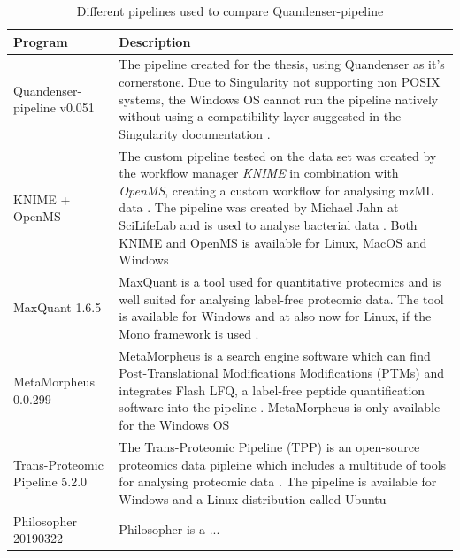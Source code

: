 \newcommand{\textone}{\small The pipeline created for the thesis, using Quandenser as it's cornerstone. Due to Singularity not supporting non POSIX systems, the Windows OS cannot run the pipeline natively without using a compatibility layer suggested in the Singularity documentation \cite{singularity-documentation}. }
\newcommand{\texttwo}{\small The custom pipeline tested on the data set was created by the workflow manager \textit{KNIME} in combination with \textit{OpenMS}, creating a custom workflow for analysing mzML data \cite{knime} \cite{openms}. The pipeline was created by Michael Jahn at SciLifeLab and is used to analyse bacterial data \cite{m-jahn-pipeline}. Both KNIME and OpenMS is available for Linux, MacOS and Windows}
\newcommand{\textthree}{\small MaxQuant is a tool used for quantitative proteomics and is well suited for analysing label-free proteomic data. The tool is available for Windows and at also now for Linux, if the Mono framework is used \cite{maxquant} \cite{maxquant-installation}.}
\newcommand{\textfour}{\small MetaMorpheus is a search engine software which can find Post-Translational Modifications Modifications (PTMs) and integrates Flash LFQ, a label-free peptide quantification software into the pipeline \cite{metamorpheus}. MetaMorpheus is only available for the Windows OS}
\newcommand{\textfive}{\small The Trans-Proteomic Pipeline (TPP) is an open-source proteomics data pipleine which includes a multitude of tools for analysing proteomic data \cite{TPP}. The pipeline is available for Windows and a Linux distribution called Ubuntu}
\newcommand{\textsix}{\small Philosopher is a ... \cite{philosopher}}
\newcommand{\textseven}{7}


\begin{table}[H]
\begin{tabular}{|p{4cm}|p{9cm}|}
\hline
Program & Description \\ \hline \hline
Quandenser-pipeline v0.051 & \textone \\ \hline
KNIME + OpenMS & \texttwo \\ \hline
MaxQuant 1.6.5 & \textthree \\ \hline
MetaMorpheus 0.0.299 & \textfour \\ \hline
Trans-Proteomic Pipeline 5.2.0 & \textfive \\ \hline
Philosopher 20190322 & \textsix \\ \hline
\end{tabular}
\caption{Different pipelines used to compare Quandenser-pipeline}
\end{table}
